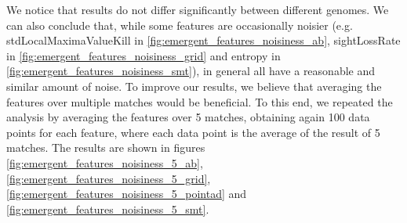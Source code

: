 \clearpage
We notice that results do not differ significantly between different genomes. We can also conclude that, while some features are occasionally noisier (e.g. stdLocalMaximaValueKill in \cref{fig:emergent_features_noisiness_ab}, sightLossRate in \cref{fig:emergent_features_noisiness_grid} and entropy in \cref{fig:emergent_features_noisiness_smt}), in general all have a reasonable and similar amount of noise. To improve our results, we believe that averaging the features over multiple matches would be beneficial. To this end, we repeated the analysis by averaging the features over 5 matches, obtaining again 100 data points for each feature, where each data point is the average of the result of 5 matches. The results are shown in figures \cref{fig:emergent_features_noisiness_5_ab}, \cref{fig:emergent_features_noisiness_5_grid}, \cref{fig:emergent_features_noisiness_5_pointad} and \cref{fig:emergent_features_noisiness_5_smt}.


